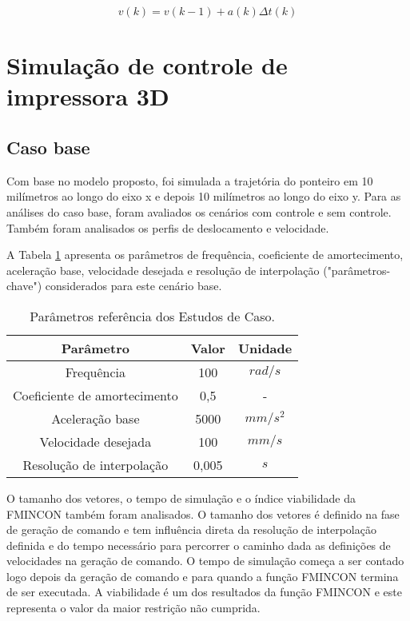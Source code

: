 \begin{equation}
    \label{eq:der_b}      
        v(k) = v(k-1)+a(k) \Delta t(k)
\end{equation}

\section{Simulação de controle de impressora 3D}

\subsection{Caso base} 

Com base no modelo proposto, foi simulada a trajetória do ponteiro em 10 milímetros ao longo do eixo x e depois 10 milímetros ao longo do eixo y. Para as análises do caso base, foram avaliados os cenários com controle e sem controle. Também foram analisados os perfis de deslocamento e velocidade. 

A Tabela \ref{tab:base_params} apresenta os parâmetros de frequência, coeficiente de amortecimento, aceleração base, velocidade desejada e resolução de interpolação ("parâmetros-chave") considerados para este cenário base.

\begin{table}
    \begin{center}
    \caption{Parâmetros referência dos Estudos de Caso.}
    \label{tab:base_params}
    \begin{tabular}{c c c}
        Parâmetro & Valor & Unidade\\ \hline
        Frequência & 100 & $rad/s$\\
        Coeficiente de amortecimento & 0,5 & - \\
        Aceleração base & 5000 & $mm/s^2$ \\
        Velocidade desejada & 100 & $mm/s$ \\
        Resolução de interpolação & 0,005 & $s$ \\ \hline
    \end{tabular}
    \end{center}
\end{table}

O tamanho dos vetores, o tempo de simulação e o índice viabilidade da FMINCON também foram analisados. O tamanho dos vetores é definido na fase de geração de comando e tem influência direta da resolução de interpolação definida e do tempo necessário para percorrer o caminho dada as definições de velocidades na geração de comando. O tempo de simulação começa a ser contado logo depois da geração de comando e para quando a função FMINCON termina de ser executada. A viabilidade é um dos resultados da função FMINCON e este representa o valor da maior restrição não cumprida.

